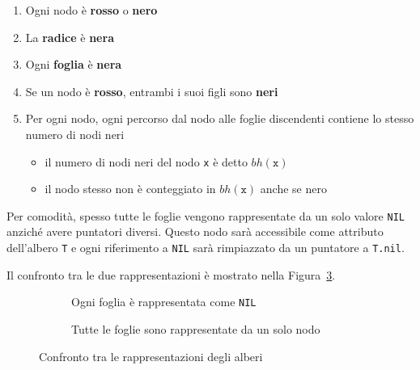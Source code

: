 \documentclass[italian, 10pt]{article}
\begin{document}
\begin{enumerate}[label=\arabic*., ref=(\arabic*)]
  \item \label{enum:proprieta-1-nodi-rb}Ogni nodo è \textbf{rosso} o \textbf{nero}
  \item \label{enum:proprieta-2-nodi-rb}La \textbf{radice} è \textbf{nera}
  \item \label{enum:proprieta-3-nodi-rb}Ogni \textbf{foglia} è \textbf{nera}
  \item \label{enum:proprieta-4-nodi-rb}Se un nodo è \textbf{rosso}, entrambi i suoi figli sono \textbf{neri}
  \item \label{enum:proprieta-5-nodi-rb} Per ogni nodo, ogni percorso dal nodo alle foglie discendenti contiene lo stesso numero di nodi neri
        \begin{itemize}
          \item il numero di nodi neri del nodo \texttt{x} è detto \(bh(\texttt{x})\)
          \item il nodo stesso non è conteggiato in \(bh(\texttt{x})\) anche se nero
        \end{itemize}
\end{enumerate}

Per comodità, spesso tutte le foglie vengono rappresentate da un solo valore \texttt{NIL} anziché avere puntatori diversi.
Questo nodo sarà accessibile come attributo dell'albero \texttt{T} e ogni riferimento a \texttt{NIL} sarà rimpiazzato da un puntatore a \texttt{T.nil}.

\bigskip
Il confronto tra le due rappresentazioni è mostrato nella Figura~\ref{fig:confronto-tra-le-rappresentazioni-degli-alberi-RB}.

\begin{figure}[htbp]
  \bigskip
  \centering
  \begin{subfigure}[b]{.495\textwidth}
    \centering
    \caption{Ogni foglia è rappresentata come \texttt{NIL}}
    \bigskip
    \label{fig:foglia-rappresentata-come-NIL}
  \end{subfigure}
  \begin{subfigure}[b]{.495\textwidth}
    \centering
    \caption{Tutte le foglie sono rappresentate da un solo nodo}
    \bigskip
    \label{fig:foglie-rappresentate-da-un-solo-nodo}
  \end{subfigure}
  \caption{Confronto tra le rappresentazioni degli alberi \RB}
  \label{fig:confronto-tra-le-rappresentazioni-degli-alberi-RB}
  \bigskip
\end{figure}
\end{document}

